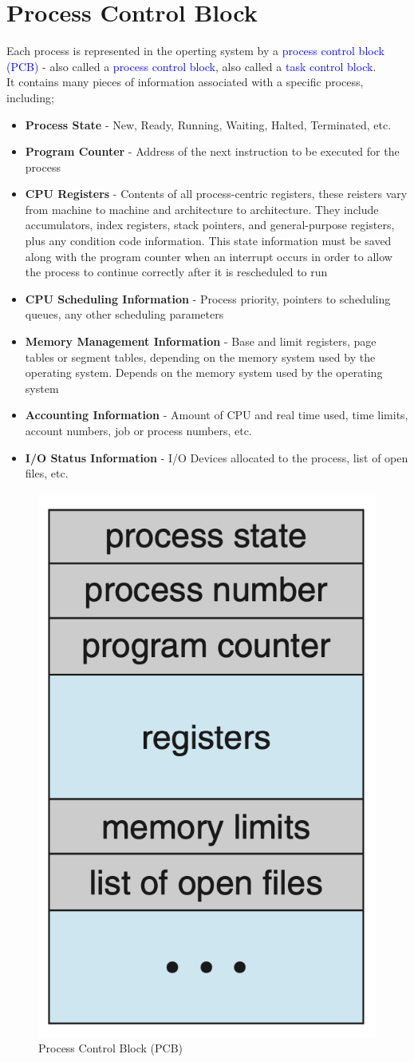 \documentclass[oneside]{book}
\begin{document}
        \section{Process Control Block}
            Each process is represented in the operting system by a \textcolor{blue}{process control block (PCB)} - also called a \textcolor{blue}{process control block},
            also called a \textcolor{blue}{task control block}.\\
            It contains many pieces of information associated with a specific process, including;
            \begin{itemize}
                \item \textbf{Process State} - New, Ready, Running, Waiting, Halted, Terminated, etc.
                \item \textbf{Program Counter} - Address of the next instruction to be executed for the process
                \item \textbf{CPU Registers} - Contents of all process-centric registers, these reisters vary from machine to machine and architecture to architecture. They include accumulators, index registers, stack pointers, and general-purpose registers, plus any condition code information. This state information must be saved along with the program counter when an interrupt occurs in order to allow the process to continue correctly after it is rescheduled to run
                \item \textbf{CPU Scheduling Information} - Process priority, pointers to scheduling queues, any other scheduling parameters
                \item \textbf{Memory Management Information} - Base and limit registers, page tables or segment tables, depending on the memory system used by the operating system. Depends on the memory system used by the operating system
                \item \textbf{Accounting Information} - Amount of CPU and real time used, time limits, account numbers, job or process numbers, etc.
                \item \textbf{I/O Status Information} - I/O Devices allocated to the process, list of open files, etc.
            \end{itemize}
            \begin{figure}[H]
                \centering
                \includegraphics[width=0.2\linewidth]{figures/process_control_block.png}
                \caption{Process Control Block (PCB)}
            \end{figure}
\end{document}

